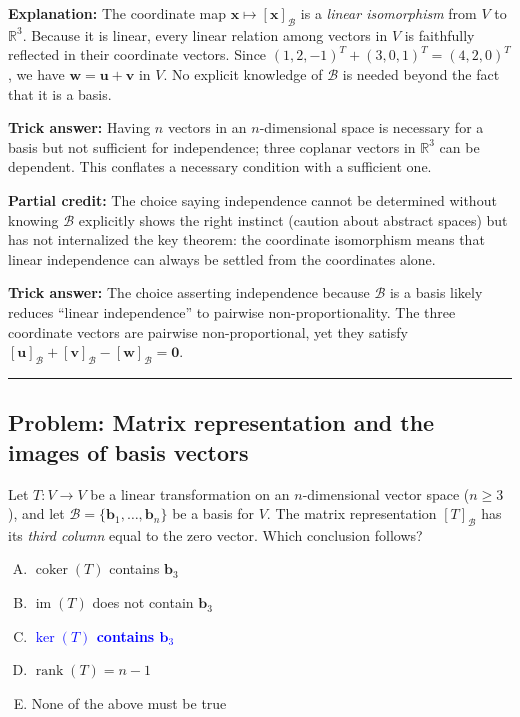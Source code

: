 \documentclass[12pt]{amsart}
\newcommand{\divider}{
  \vspace{-1em}
  \noindent
  \raisebox{-0.15ex}{\textbullet}%
  \hspace{0.5em}%
  \rule[0.5ex]{0.95\textwidth}{1.0pt}%
  \hspace{0.5em}%
  \raisebox{-0.15ex}{\textbullet}%
  \vspace{0em}
}
\begin{document}
\textbf{Explanation:}
The coordinate map $\mathbf{x}\mapsto[\mathbf{x}]_\mathcal{B}$ is a
\emph{linear isomorphism} from $V$ to $\mathbb{R}^3$.
Because it is linear, every linear relation among vectors in $V$ is faithfully
reflected in their coordinate vectors.
Since $(1,2,-1)^T + (3,0,1)^T = (4,2,0)^T$, we have $\mathbf{w} = \mathbf{u}+\mathbf{v}$ in $V$.
No explicit knowledge of $\mathcal{B}$ is needed beyond the fact that it is a basis.

\textbf{Trick answer:}
Having $n$ vectors in an $n$-dimensional space is necessary for a basis but
not sufficient for independence; three coplanar vectors in $\mathbb{R}^3$ can be
dependent.
This conflates a necessary condition with a sufficient one.

\textbf{Partial credit:}
The choice saying independence cannot be determined without knowing $\mathcal{B}$
explicitly shows the right instinct (caution about abstract spaces) but has
not internalized the key theorem: the coordinate isomorphism means that linear
independence can always be settled from the coordinates alone.

\textbf{Trick answer:}
The choice asserting independence because $\mathcal{B}$ is a basis likely reduces
``linear independence'' to pairwise non-proportionality.
The three coordinate vectors are pairwise non-proportional, yet they satisfy
$[\mathbf{u}]_\mathcal{B} + [\mathbf{v}]_\mathcal{B} - [\mathbf{w}]_\mathcal{B} = \mathbf{0}$.

\divider

\subsection*{Problem: Matrix representation and the images of basis vectors}

Let $T: V \to V$ be a linear transformation on an $n$-dimensional vector space
($n \geq 3$), and let $\mathcal{B} = \{\mathbf{b}_1, \ldots, \mathbf{b}_n\}$ be a basis for $V$.
The matrix representation $[T]_\mathcal{B}$ has its \emph{third column} equal to the zero vector.
Which conclusion follows?

\begin{enumerate}[(A)]
\item $\operatorname{coker}(T)$ contains $\mathbf{b}_3$
\item $\operatorname{im}(T)$ does not contain $\mathbf{b}_3$
\item \textcolor{blue}{\textbf{$\ker(T)$ contains $\mathbf{b}_3$}}
\item $\operatorname{rank}(T) = n - 1$
\item None of the above must be true
\end{enumerate}
\end{document}
